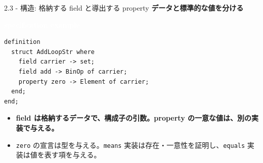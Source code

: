 \documentclass[dvipdfmx,aspectratio=169,11pt]{beamer}
\newcommand{\statusbadge}[2]{\colorbox{#1}{\textcolor{white}{\strut\scriptsize\sffamily\bfseries #2}}}
\newcommand{\badgeSpec}{\statusbadge{green!35!black}{specification example}}
\begin{document}
\begin{frame}[fragile,t]{2.3 - 構造: 格納する field と導出する property}
\smallskip
\textbf{データと標準的な値を分ける}~\badgeSpec
\begin{lstlisting}[language={mizar},basicstyle=\ttfamily\small]
definition
  struct AddLoopStr where
    field carrier -> set;
    field add -> BinOp of carrier;
    property zero -> Element of carrier;
  end;
end;
\end{lstlisting}
\begin{itemize}
\setlength{\itemsep}{1pt}
\setlength{\parsep}{0pt}
\setlength{\parskip}{0pt}
\item \textcolor{blue!55!black}{\textbf{field は格納するデータで、構成子の引数。property の一意な値は、別の実装で与える。}}
\item \texttt{zero} の宣言は型を与える。\texttt{means} 実装は存在・一意性を証明し、\texttt{equals} 実装は値を表す項を与える。
\end{itemize}
\end{frame}
\end{document}
